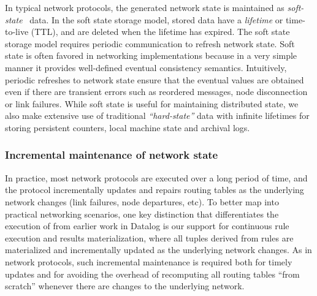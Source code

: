 In typical network protocols, the generated network state is maintained
as {\em soft-state}~\cite{clark88design} data. In the soft state storage
model, stored data have a {\em lifetime} or time-to-live (TTL), and are
deleted when the lifetime has expired. The soft state storage model
requires periodic communication to refresh network state. Soft state is
often favored in networking implementations because in a very simple
manner it provides well-defined eventual consistency
semantics. Intuitively, periodic refreshes to network state ensure that
the eventual values are obtained even if there are transient errors such
as reordered messages, node disconnection or link failures. While soft
state is useful for maintaining distributed state, we also make
extensive use of traditional {\em ``hard-state''} data with infinite
lifetimes for storing persistent counters, local machine state and
archival logs.


\subsubsection{Incremental maintenance of network state} 

In practice, most network protocols are executed over a long period of
time, and the protocol incrementally updates and repairs routing tables
as the underlying network changes (link failures, node departures, etc).
To better map into practical networking scenarios, one key distinction
that differentiates the execution of \Lang from earlier work in Datalog
is our support for continuous rule execution and results
materialization, where all tuples derived from \Lang rules are
materialized and incrementally updated as the underlying network
changes. As in network protocols, such incremental maintenance is
required both for timely updates and for avoiding the overhead of
recomputing all routing tables ``from scratch'' whenever there are
changes to the underlying network.

